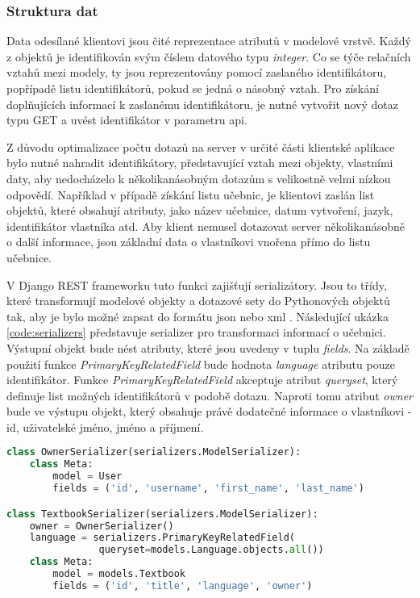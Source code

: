 \documentclass[a4paper,11pt,titlepage,fleqn]{article}
\begin{document}
        \subsubsection{Struktura dat}
            Data odesílané klientovi jsou čité reprezentace atributů v modelové vrstvě. Každý z objektů je identifikován svým číslem datového typu \textit{integer}. Co se týče relačních vztahů mezi modely, ty jsou reprezentovány pomocí zaslaného identifikátoru, popřípadě listu identifikátorů, pokud se jedná o násobný vztah. Pro získání doplňujících informací k zaslanému identifikátoru, je nutné vytvořit nový dotaz typu GET a uvést identifikátor v parametru \gls{api}. 

            Z důvodu optimalizace počtu dotazů na server v určité části klientské aplikace bylo nutné nahradit identifikátory, představující vztah mezi objekty, vlastními daty, aby nedocházelo k několikanásobným dotazům s velikostně velmi nízkou odpovědí. Například v případě získání listu učebnic, je klientovi zaslán list objektů, které obsahují atributy, jako název učebnice, datum vytvoření, jazyk, identifikátor vlastníka atd. Aby klient nemusel dotazovat server několikanásobně o další informace, jsou základní data o vlastníkovi vnořena přímo do listu učebnice.

            V Django REST frameworku tuto funkci zajišťují serializátory. Jsou to třídy, které transformují modelové objekty a dotazové sety do Pythonových objektů tak, aby je bylo možné zapsat do formátu \gls{json} nebo \gls{xml} \cite{bib:django-rest}. Následující ukázka \ref{code:serializers} představuje serializer pro transformaci informací o učebnici. Výstupní objekt bude nést atributy, které jsou uvedeny v tuplu \textit{fields}. Na základě použití funkce \textit{PrimaryKeyRelatedField} bude hodnota \textit{language} atributu pouze identifikátor. Funkce \textit{PrimaryKeyRelatedField} akceptuje atribut \textit{queryset}, který definuje list možných identifikátorů v podobě dotazu. Naproti tomu atribut \textit{owner} bude ve výstupu objekt, který obsahuje právě dodatečné informace o vlastníkovi - id, uživatelské jméno, jméno a příjmení. 

\begin{minipage}[c]{0.95\textwidth}
\begin{lstlisting}[language=Python, caption={Serializační třída k transformaci dat o učebnici},label=code:serializers]
class OwnerSerializer(serializers.ModelSerializer):
    class Meta:
        model = User
        fields = ('id', 'username', 'first_name', 'last_name')

class TextbookSerializer(serializers.ModelSerializer):
    owner = OwnerSerializer()
    language = serializers.PrimaryKeyRelatedField(
                queryset=models.Language.objects.all())
    class Meta:
        model = models.Textbook
        fields = ('id', 'title', 'language', 'owner')
\end{lstlisting}
\end{minipage}
\end{document}
